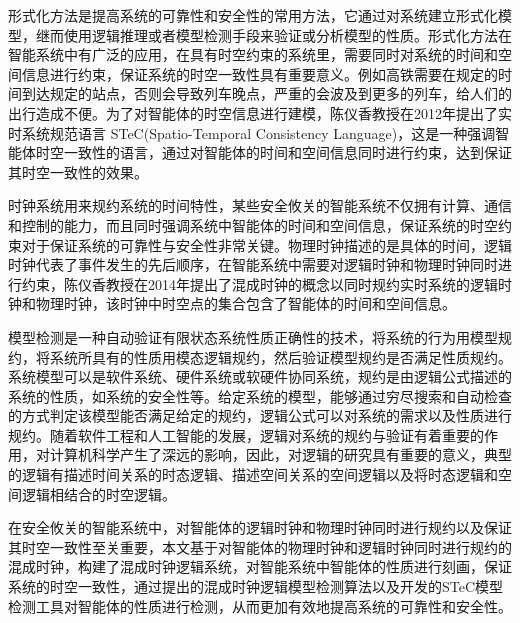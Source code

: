 形式化方法是提高系统的可靠性和安全性的常用方法，它通过对系统建立形式化模型，继而使用逻辑推理或者模型检测手段来验证或分析模型的性质。形式化方法在智能系统中有广泛的应用，在具有时空约束的系统里，需要同时对系统的时间和空间信息进行约束，保证系统的时空一致性具有重要意义。例如高铁需要在规定的时间到达规定的站点，否则会导致列车晚点，严重的会波及到更多的列车，给人们的出行造成不便。为了对智能体的时空信息进行建模，陈仪香教授在2012年提出了实时系统规范语言 STeC(Spatio-Temporal Consistency Language)，这是一种强调智能体时空一致性的语言，通过对智能体的时间和空间信息同时进行约束，达到保证其时空一致性的效果。

时钟系统用来规约系统的时间特性，某些安全攸关的智能系统不仅拥有计算、通信和控制的能力，而且同时强调系统中智能体的时间和空间信息，保证系统的时空约束对于保证系统的可靠性与安全性非常关键。物理时钟描述的是具体的时间，逻辑时钟代表了事件发生的先后顺序，在智能系统中需要对逻辑时钟和物理时钟同时进行约束，陈仪香教授在2014年提出了混成时钟的概念以同时规约实时系统的逻辑时钟和物理时钟，该时钟中时空点的集合包含了智能体的时间和空间信息。

模型检测是一种自动验证有限状态系统性质正确性的技术，将系统的行为用模型规约，将系统所具有的性质用模态逻辑规约，然后验证模型规约是否满足性质规约。系统模型可以是软件系统、硬件系统或软硬件协同系统，规约是由逻辑公式描述的系统的性质，如系统的安全性等。给定系统的模型，能够通过穷尽搜索和自动检查的方式判定该模型能否满足给定的规约，逻辑公式可以对系统的需求以及性质进行规约。随着软件工程和人工智能的发展，逻辑对系统的规约与验证有着重要的作用，对计算机科学产生了深远的影响，因此，对逻辑的研究具有重要的意义，典型的逻辑有描述时间关系的时态逻辑、描述空间关系的空间逻辑以及将时态逻辑和空间逻辑相结合的时空逻辑。

在安全攸关的智能系统中，对智能体的逻辑时钟和物理时钟同时进行规约以及保证其时空一致性至关重要，本文基于对智能体的物理时钟和逻辑时钟同时进行规约的混成时钟，构建了混成时钟逻辑系统，对智能系统中智能体的性质进行刻画，保证系统的时空一致性，通过提出的混成时钟逻辑模型检测算法以及开发的STeC模型检测工具对智能体的性质进行检测，从而更加有效地提高系统的可靠性和安全性。

